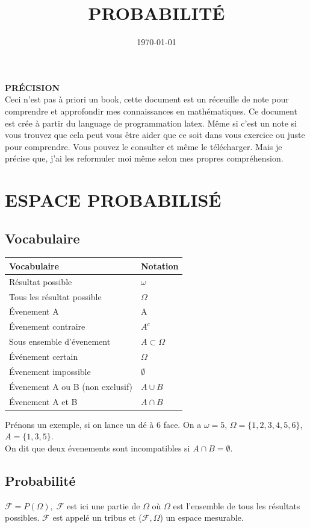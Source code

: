\documentclass[a4paper, 12pt, french]{report}
\title{PROBABILITÉ}
\author{}
\date{\today}
\theoremstyle{break}
\begin{document}
\maketitle

\textbf{PRÉCISION} \\
Ceci n'est pas à priori un book, cette document est un réceuille de note pour comprendre et approfondir mes connaissances en mathématiques.
Ce document est crée à partir du language de programmation latex. Même si c'est un note si vous trouvez que cela peut vous être aider que ce soit dans vous exercice ou juste pour comprendre.
Vous pouvez le consulter et même le télécharger.
Mais je précise que, j'ai les reformuler moi même selon mes propres compréhension.

\tableofcontents

\chapter{ESPACE PROBABILISÉ}

\section{Vocabulaire}

\begin{center}
	\begin{tabular}{|p{8cm}|p{3cm}|}
	\hline
	Vocabulaire & Notation \\ \hline
	Résultat possible & $\omega$ \\
	Tous les résultat possible & $\Omega$ \\
	Évenement A & A \\
	Évenement contraire & $A^{c}$ \\
	Sous ensemble d'évenement & $A \subset \Omega$ \\
	Événement certain & $\Omega$ \\
	Évenement impossible & $\emptyset$ \\
	Évenement A ou B (non exclusif) & $A \cup B$ \\
	Évenement A et B & $A \cap B$ \\
	\hline
\end{tabular}
\end{center}
Prénons un exemple, si on lance un dé à 6 face. On a $\omega = 5$, $\Omega = \{1,2,3,4,5,6\}$, $A = \{1,3,5\}$.\\
On dit que deux évenements sont incompatibles si $A \cap B = \emptyset$.

\section{Probabilité}
$\mathcal{F} = P(\Omega), \; \mathcal{F}$ est ici une partie de $\Omega$ où $\Omega$ est l'ensemble de tous les résultats possibles. $\mathcal{F}$ est appelé un tribus et ($\mathcal{F}, \Omega$) un espace mesurable.
\end{document}
